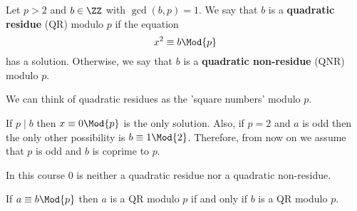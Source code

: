 \documentclass[12pt, a4paper]{article}
\begin{document}
\begin{definition}
    Let \(p>2\) and \(b\in \ZZ\) with \(\gcd(b,p)=1\). We say that \(b\) is a \textbf{quadratic residue} (QR) modulo \(p\) if the equation 
    \[x^2 \equiv b \Mod{p}\]
    has a solution. Otherwise, we say that \(b\) is a \textbf{quadratic non-residue} (QNR) modulo \(p\).
\end{definition}

\begin{mdnote}
    We can think of quadratic residues as the 'square numbers' modulo \(p\).
\end{mdnote}

\begin{mdremark}
    If \(p\mid b\) then \(x\equiv 0 \Mod{p}\) is the only solution. Also, if \(p=2\) and \(a\) is odd then the only other possibility is \(b \equiv 1 \Mod{2}\). Therefore, from now on we assume that \(p\) is odd and \(b\) is coprime to \(p\).
\end{mdremark}

\begin{mdremark}
    In this course \(0\) is neither a quadratic residue nor a quadratic non-residue.
\end{mdremark}


\begin{corollary}
    If \(a \equiv b \Mod{p}\) then \(a\) is a QR modulo \(p\) if and only if \(b\) is a QR modulo \(p\).
\end{corollary}
\end{document}
